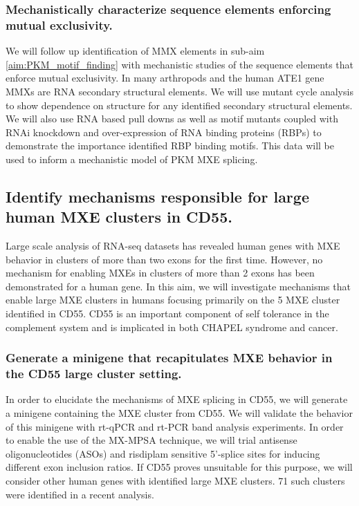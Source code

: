 \documentclass{article}
\begin{document}
\subsubsection{Mechanistically characterize sequence elements enforcing mutual exclusivity.} \label{aim:PKM_mechanistic}
We will follow up identification of MMX elements in sub-aim \ref{aim:PKM_motif_finding} with mechanistic studies of the sequence elements that enforce mutual exclusivity. 
In many arthropods and the human ATE1 gene \cite{Graveley2005-oi, Jin2018-tq, Kalinina2021-jt} MMXs are RNA secondary structural elements. 
We will use mutant cycle analysis to show dependence on structure for any identified secondary structural elements. 
We will also use RNA based pull downs as well as motif mutants coupled with RNAi knockdown and over-expression of RNA binding proteins (RBPs) to demonstrate the importance identified RBP binding motifs.
This data will be used to inform a mechanistic model of PKM MXE splicing.
%
\subsection{Identify mechanisms responsible for large human MXE clusters in CD55.}
Large scale analysis of RNA-seq datasets has revealed human genes with MXE behavior in clusters of more than two exons for the first time.\cite{Hatje2017-oj} 
However, no mechanism for enabling MXEs in clusters of more than 2 exons has been demonstrated for a human gene. 
In this aim, we will investigate mechanisms that enable large MXE clusters in humans focusing primarily on the 5 MXE cluster identified in CD55. 
CD55 is an important component of self tolerance in the complement system and is implicated in both CHAPEL syndrome and cancer.\cite{Bharti2022-oz,Stallard2023-ll}
%
\subsubsection{Generate a minigene that recapitulates MXE behavior in the CD55 large cluster setting.}  \label{aim:CD55_minigene}
In order to elucidate the mechanisms of MXE splicing in CD55, we will generate a minigene containing the MXE cluster from CD55.
We will validate the behavior of this minigene with rt-qPCR and rt-PCR band analysis experiments. 
In order to enable the use of the MX-MPSA technique, we will trial antisense oligonucleotides (ASOs) and risdiplam sensitive 5'-splice sites for inducing different exon inclusion ratios.
If CD55 proves unsuitable for this purpose, we will consider other human genes with identified large MXE clusters.
71 such clusters were identified in a recent analysis.\cite{Hatje2017-oj} 
%
\end{document}
